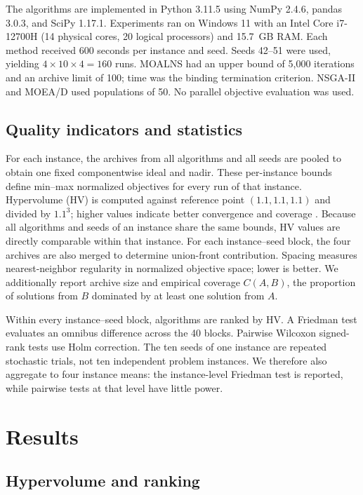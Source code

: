 \documentclass[11pt,a4paper]{article}
\newcommand{\MOALNS}{MOALNS}
\begin{document}
The algorithms are implemented in Python 3.11.5 using NumPy 2.4.6, pandas 3.0.3, and SciPy 1.17.1. Experiments ran on Windows 11 with an Intel Core i7-12700H (14 physical cores, 20 logical processors) and 15.7~GB RAM. Each method received 600 seconds per instance and seed. Seeds 42--51 were used, yielding $4\times10\times4=160$ runs. \MOALNS{} had an upper bound of 5,000 iterations and an archive limit of 100; time was the binding termination criterion. NSGA-II and MOEA/D used populations of 50. No parallel objective evaluation was used.

\subsection{Quality indicators and statistics}

For each instance, the archives from all algorithms and all seeds are pooled to obtain one fixed componentwise ideal and nadir. These per-instance bounds define min--max normalized objectives for every run of that instance. Hypervolume (HV) is computed against reference point $(1.1,1.1,1.1)$ and divided by $1.1^3$; higher values indicate better convergence and coverage \cite{zitzler1999multiobjective}. Because all algorithms and seeds of an instance share the same bounds, HV values are directly comparable within that instance. For each instance--seed block, the four archives are also merged to determine union-front contribution. Spacing measures nearest-neighbor regularity in normalized objective space; lower is better. We additionally report archive size and empirical coverage $C(A,B)$, the proportion of solutions from $B$ dominated by at least one solution from $A$.

Within every instance--seed block, algorithms are ranked by HV. A Friedman test evaluates an omnibus difference across the 40 blocks. Pairwise Wilcoxon signed-rank tests use Holm correction. The ten seeds of one instance are repeated stochastic trials, not ten independent problem instances. We therefore also aggregate to four instance means: the instance-level Friedman test is reported, while pairwise tests at that level have little power.

\section{Results}

\subsection{Hypervolume and ranking}
\end{document}
